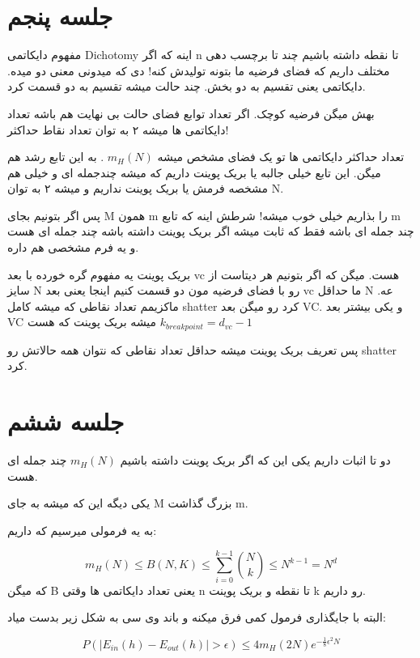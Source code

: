 \documentclass[twocolumn,11pt]{article}
\begin{document}
\section{جلسه پنجم}
مفهوم دایکاتمی Dichotomy اینه که اگر n تا نقطه داشته باشیم چند تا برچسب دهی مختلف داریم که فضای فرضیه ما بتونه تولیدش کنه! دی که میدونی معنی دو میده. دایکاتمی یعنی تقسیم به دو بخش. چند حالت میشه تقسیم به دو قسمت کرد. 

بهش میگن فرضیه کوچک. اگر تعداد توابع فضای حالت بی نهایت هم باشه تعداد دایکاتمی ها میشه ۲ به توان تعداد نقاط حداکثر! 

تعداد حداکثر دایکاتمی ها تو یک فضای مشخص میشه
$m_H(N)$
.
به این تابع رشد هم میگن. 
این تابع خیلی جالبه یا بریک پوینت داریم که میشه چندجمله ای و خیلی هم مشخصه فرمش یا بریک پوینت نداریم و میشه ۲ به توان N.


پس اگر بتونیم بجای M همون m را بذاریم خیلی خوب میشه! 
شرطش اینه که تابع m چند جمله ای باشه فقط که ثابت میشه اگر بریک پوینت داشته باشه چند جمله ای هست و یه فرم 
مشخصی هم داره. 

بریک پوینت یه مفهوم گره خورده با بعد vc هست. میگن که اگر بتونیم هر دیتاست از سایز N رو با فضای فرضیه مون دو قسمت کنیم اینجا یعنی بعد vc ما حداقل N عه. ماکزیمم تعداد نقاطی که میشه کامل shatter کرد رو میگن بعد VC. 
و یکی بیشتر بعد 
VC
میشه بریک پوینت که هست
$k_{breakpoint} = d_{vc} - 1$

پس تعریف بریک پوینت میشه حداقل تعداد نقاطی که نتوان همه حالاتش رو shatter کرد. 

\section{جلسه ششم}
دو تا اثبات داریم یکی این که اگر بریک پوینت داشته باشیم 
$m_H(N)$
چند جمله ای هست. 

یکی دیگه این که میشه به جای M
بزرگ گذاشت m.

به یه فرمولی میرسیم که داریم:

\begin{equation}
m_H(N) \leq B(N,K) \leq \sum_{i=0}^{k-1} {N \choose k}  
\leq N^{k-1} = N^d
\end{equation}
که میگن B یعنی تعداد دایکاتمی ها وقتی n
 تا نقطه و بریک پوینت k رو داریم. 


البته با جایگذاری فرمول کمی فرق میکنه و باند وی سی به شکل زیر بدست میاد:

\begin{equation}
P(|E_{in}(h) - E_{out}(h)| > \epsilon) \leq
4 m_H(2N) e^{-\frac{1}{8} \epsilon^2 N}  
\end{equation}
\end{document}
